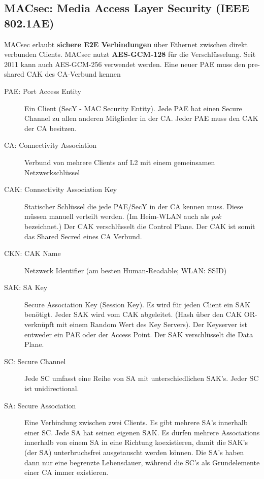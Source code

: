 \subsection{MACsec: Media Access Layer Security (IEEE 802.1AE)}\label{sec:macsec-media-access-layer-security-ieee-8021ae}
MACsec erlaubt \textbf{sichere E2E Verbindungen} über Ethernet zwischen direkt verbunden Clients. MACsec nutzt \textbf{AES-GCM-128} für die Verschlüsselung. Seit 2011 kann auch AES-GCM-256 verwendet werden. Eine neuer PAE muss den pre-shared CAK des CA-Verbund kennen
\begin{description}
	\item[PAE: Port Access Entity] Ein Client (SecY - MAC Security Entity). Jede PAE hat einen Secure Channel zu allen anderen Mitglieder in der CA. Jeder PAE muss den CAK der CA besitzen. 
	\item[CA: Connectivity Association] Verbund von mehrere Clients auf L2 mit einem gemeinsamen Netzwerkschlüssel
	\item[CAK: Connectivity Association Key] Statischer Schlüssel die jede PAE/SecY in der CA kennen muss. Diese müssen manuell verteilt werden. (Im Heim-WLAN auch als \textit{psk} bezeichnet.) Der CAK verschlüsselt die Control Plane. Der CAK ist somit das Shared Secred eines CA Verbund.
	\item[CKN: CAK Name] Netzwerk Identifier (am besten Human-Readable; WLAN: SSID)
	\item[SAK: SA Key] Secure Association Key (Session Key). Es wird für jeden Client ein SAK benötigt. Jeder SAK wird vom CAK abgeleitet. (Hash über den CAK OR-verknüpft mit einem Random Wert des Key Servers). Der Keyserver ist entweder ein PAE oder der Access Point. Der SAK verschlüsselt die Data Plane.
	\item[SC: Secure Channel] Jede SC umfasst eine Reihe von SA mit unterschiedlichen SAK's. Jeder SC ist unidirectional. 
	\item[SA: Secure Association] Eine Verbindung zwischen zwei Clients. Es gibt mehrere SA's innerhalb einer SC. Jede SA hat seinen eigenen SAK. Es dürfen mehrere Associations innerhalb von einem SA in eine Richtung koexistieren, damit die SAK's (der SA) unterbruchsfrei ausgetauscht werden können.  Die SA's haben dann nur eine begrenzte Lebensdauer, während die SC's als Grundelemente einer CA immer existieren. 
\end{description}

